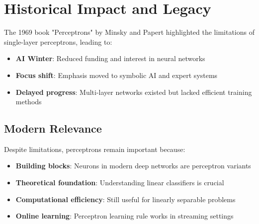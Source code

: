 \section{Historical Impact and Legacy}
The 1969 book "Perceptrons" by Minsky and Papert highlighted the limitations of single-layer perceptrons, leading to:
\begin{itemize}
    \item \textbf{AI Winter}: Reduced funding and interest in neural networks
    \item \textbf{Focus shift}: Emphasis moved to symbolic AI and expert systems
    \item \textbf{Delayed progress}: Multi-layer networks existed but lacked efficient training methods
\end{itemize}

\subsection{Modern Relevance}
Despite limitations, perceptrons remain important because:
\begin{itemize}
    \item \textbf{Building blocks}: Neurons in modern deep networks are perceptron variants
    \item \textbf{Theoretical foundation}: Understanding linear classifiers is crucial
    \item \textbf{Computational efficiency}: Still useful for linearly separable problems
    \item \textbf{Online learning}: Perceptron learning rule works in streaming settings
\end{itemize}

